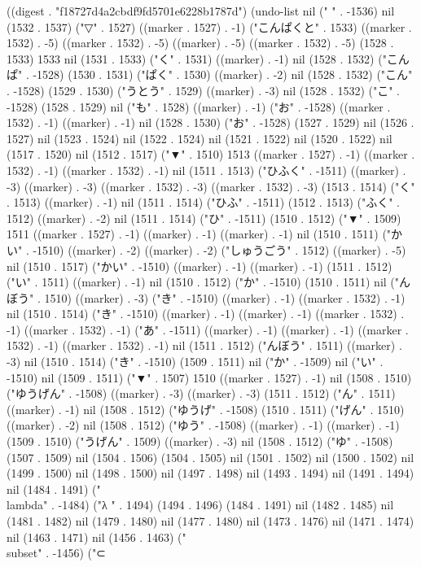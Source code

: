 
((digest . "f18727d4a2cbdf9fd5701e6228b1787d") (undo-list nil (" " . -1536) nil (1532 . 1537) ("▽" . 1527) ((marker . 1527) . -1) ("こんぱくと" . 1533) ((marker . 1532) . -5) ((marker . 1532) . -5) ((marker) . -5) ((marker . 1532) . -5) (1528 . 1533) 1533 nil (1531 . 1533) ("く" . 1531) ((marker) . -1) nil (1528 . 1532) ("こんぱ" . -1528) (1530 . 1531) ("ぱく" . 1530) ((marker) . -2) nil (1528 . 1532) ("こん" . -1528) (1529 . 1530) ("うとう" . 1529) ((marker) . -3) nil (1528 . 1532) ("こ" . -1528) (1528 . 1529) nil ("も" . 1528) ((marker) . -1) ("お" . -1528) ((marker . 1532) . -1) ((marker) . -1) nil (1528 . 1530) ("お" . -1528) (1527 . 1529) nil (1526 . 1527) nil (1523 . 1524) nil (1522 . 1524) nil (1521 . 1522) nil (1520 . 1522) nil (1517 . 1520) nil (1512 . 1517) ("▼" . 1510) 1513 ((marker . 1527) . -1) ((marker . 1532) . -1) ((marker . 1532) . -1) nil (1511 . 1513) ("ひふく" . -1511) ((marker) . -3) ((marker) . -3) ((marker . 1532) . -3) ((marker . 1532) . -3) (1513 . 1514) ("く" . 1513) ((marker) . -1) nil (1511 . 1514) ("ひふ" . -1511) (1512 . 1513) ("ふく" . 1512) ((marker) . -2) nil (1511 . 1514) ("ひ" . -1511) (1510 . 1512) ("▼" . 1509) 1511 ((marker . 1527) . -1) ((marker) . -1) ((marker) . -1) nil (1510 . 1511) ("かい" . -1510) ((marker) . -2) ((marker) . -2) ("しゅうごう" . 1512) ((marker) . -5) nil (1510 . 1517) ("かい" . -1510) ((marker) . -1) ((marker) . -1) (1511 . 1512) ("い" . 1511) ((marker) . -1) nil (1510 . 1512) ("か" . -1510) (1510 . 1511) nil ("んぼう" . 1510) ((marker) . -3) ("き" . -1510) ((marker) . -1) ((marker . 1532) . -1) nil (1510 . 1514) ("き" . -1510) ((marker) . -1) ((marker) . -1) ((marker . 1532) . -1) ((marker . 1532) . -1) ("あ" . -1511) ((marker) . -1) ((marker) . -1) ((marker . 1532) . -1) ((marker . 1532) . -1) nil (1511 . 1512) ("んぼう" . 1511) ((marker) . -3) nil (1510 . 1514) ("き" . -1510) (1509 . 1511) nil ("か" . -1509) nil ("い" . -1510) nil (1509 . 1511) ("▼" . 1507) 1510 ((marker . 1527) . -1) nil (1508 . 1510) ("ゆうげん" . -1508) ((marker) . -3) ((marker) . -3) (1511 . 1512) ("ん" . 1511) ((marker) . -1) nil (1508 . 1512) ("ゆうげ" . -1508) (1510 . 1511) ("げん" . 1510) ((marker) . -2) nil (1508 . 1512) ("ゆう" . -1508) ((marker) . -1) ((marker) . -1) (1509 . 1510) ("うげん" . 1509) ((marker) . -3) nil (1508 . 1512) ("ゆ" . -1508) (1507 . 1509) nil (1504 . 1506) (1504 . 1505) nil (1501 . 1502) nil (1500 . 1502) nil (1499 . 1500) nil (1498 . 1500) nil (1497 . 1498) nil (1493 . 1494) nil (1491 . 1494) nil (1484 . 1491) ("\\lambda" . -1484) ("λ
" . 1494) (1494 . 1496) (1484 . 1491) nil (1482 . 1485) nil (1481 . 1482) nil (1479 . 1480) nil (1477 . 1480) nil (1473 . 1476) nil (1471 . 1474) nil (1463 . 1471) nil (1456 . 1463) ("\\subset" . -1456) ("⊂
